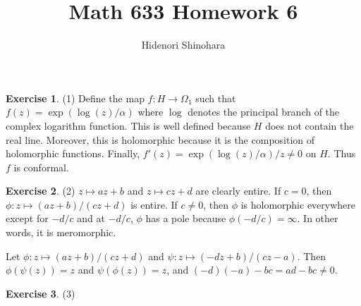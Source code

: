 \documentclass[12pt, psamsfonts]{amsart}
\theoremstyle{definition}
\newtheorem*{exer}{Exercise}
\theoremstyle{remark}
\numberwithin{equation}{section}
\begin{document}
\title{Math 633 Homework 6}
\author{Hidenori Shinohara}
\maketitle


\begin{exer}{(1)}
  Define the map $f: H \rightarrow \Omega_1$ such that $f(z) = \exp(\log(z)/\alpha)$ where $\log$ denotes the principal branch of the complex logarithm function.
  This is well defined because $H$ does not contain the real line.
  Moreover, this is holomorphic because it is the composition of holomorphic functions.
  Finally, $f'(z) = \exp(\log(z)/\alpha) / z \ne 0$ on $H$.
  Thus $f$ is conformal.
\end{exer}

\begin{exer}{(2)}
  $z \mapsto az + b$ and $z \mapsto cz + d$ are clearly entire.
  If $c = 0$, then $\phi: z \mapsto (az + b) / (cz + d)$ is entire.
  If $c \ne 0$, then $\phi$ is holomorphic everywhere except for $-d / c$ and at $-d / c$, $\phi$ has a pole because $\phi(-d / c) = \infty$.
  In other words, it is meromorphic.

  Let $\phi: z \mapsto (az + b) / (cz + d)$ and $\psi: z \mapsto (-dz + b) / (cz - a)$.
  Then $\phi(\psi(z)) = z$ and $\psi(\phi(z)) = z$, and $(-d)(-a) - bc = ad - bc \ne 0$.

\end{exer}

\begin{exer}{(3)}
  \todo[inline,caption={}]{
  }
\end{exer}
\end{document}
